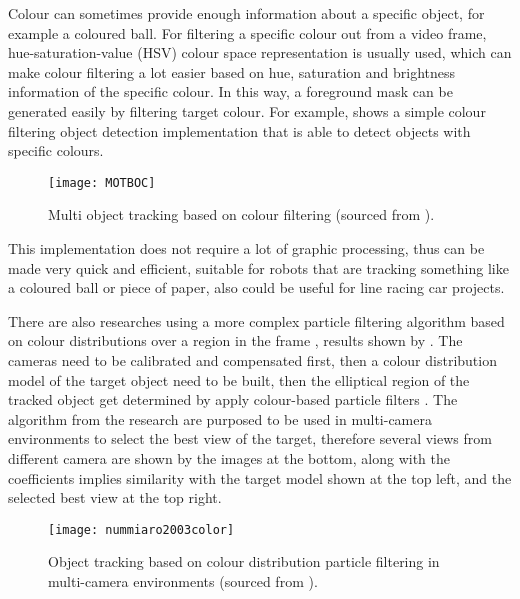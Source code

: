 Colour can sometimes provide enough information about a specific object, for example a coloured ball. For filtering a specific colour out from a video frame, hue-saturation-value (HSV) colour space \cite[p.~301]{colourspace} representation is usually used, which can make colour filtering a lot easier based on hue, saturation and brightness information of the specific colour. In this way, a foreground mask can be generated easily by filtering target colour. For example,  shows a simple colour filtering object detection implementation \cite{MOTBOC.git} that is able to detect objects with specific colours.

\begin{figure}[H]
  \centering
  \texttt{[image: MOTBOC]}
  \caption{Multi object tracking based on colour filtering (sourced from \cite{MOTBOC.git}).}
  \label{Figure:MOTBOC}
\end{figure}

This implementation does not require a lot of graphic processing, thus can be made very quick and efficient, suitable for robots that are tracking something like a coloured ball or piece of paper, also could be useful for line racing car projects.

There are also researches using a more complex particle filtering algorithm based on colour distributions over a region in the frame \cite{nummiaro2003color}, results shown by . The cameras need to be calibrated and compensated first, then a colour distribution model of the target object need to be built, then the elliptical region of the tracked object get determined by apply colour-based particle filters \cite{nummiaro2003adaptive}. The algorithm from the research are purposed to be used in multi-camera environments to select the best view of the target, therefore several views from different camera are shown by the images at the bottom, along with the coefficients implies similarity with the target model shown at the top left, and the selected best view at the top right.

\begin{figure}[H]
  \centering
  \texttt{[image: nummiaro2003color]}
  \caption{Object tracking based on colour distribution particle filtering in multi-camera environments (sourced from \cite{nummiaro2003color}).}
  \label{Figure:nummiaro2003color}
\end{figure}

